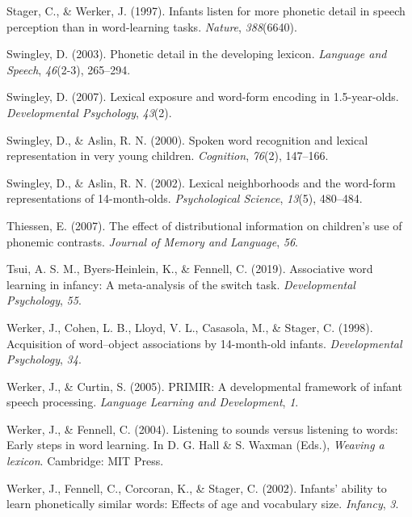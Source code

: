 \documentclass[english,,man]{apa6}
\begin{document}
\leavevmode\hypertarget{ref-stager1997}{}%
Stager, C., \& Werker, J. (1997). Infants listen for more phonetic detail in speech perception than in word-learning tasks. \emph{Nature}, \emph{388}(6640).

\leavevmode\hypertarget{ref-swingley2003}{}%
Swingley, D. (2003). Phonetic detail in the developing lexicon. \emph{Language and Speech}, \emph{46}(2-3), 265--294.

\leavevmode\hypertarget{ref-swingley2007}{}%
Swingley, D. (2007). Lexical exposure and word-form encoding in 1.5-year-olds. \emph{Developmental Psychology}, \emph{43}(2).

\leavevmode\hypertarget{ref-swingley2000}{}%
Swingley, D., \& Aslin, R. N. (2000). Spoken word recognition and lexical representation in very young children. \emph{Cognition}, \emph{76}(2), 147--166.

\leavevmode\hypertarget{ref-swingley2002}{}%
Swingley, D., \& Aslin, R. N. (2002). Lexical neighborhoods and the word-form representations of 14-month-olds. \emph{Psychological Science}, \emph{13}(5), 480--484.

\leavevmode\hypertarget{ref-thiessen2007}{}%
Thiessen, E. (2007). The effect of distributional information on children's use of phonemic contrasts. \emph{Journal of Memory and Language}, \emph{56}.

\leavevmode\hypertarget{ref-tsui2019}{}%
Tsui, A. S. M., Byers-Heinlein, K., \& Fennell, C. (2019). Associative word learning in infancy: A meta-analysis of the switch task. \emph{Developmental Psychology}, \emph{55}.

\leavevmode\hypertarget{ref-werker1998}{}%
Werker, J., Cohen, L. B., Lloyd, V. L., Casasola, M., \& Stager, C. (1998). Acquisition of word--object associations by 14-month-old infants. \emph{Developmental Psychology}, \emph{34}.

\leavevmode\hypertarget{ref-werker2005}{}%
Werker, J., \& Curtin, S. (2005). PRIMIR: A developmental framework of infant speech processing. \emph{Language Learning and Development}, \emph{1}.

\leavevmode\hypertarget{ref-werker2004}{}%
Werker, J., \& Fennell, C. (2004). Listening to sounds versus listening to words: Early steps in word learning. In D. G. Hall \& S. Waxman (Eds.), \emph{Weaving a lexicon}. Cambridge: MIT Press.

\leavevmode\hypertarget{ref-werker2002}{}%
Werker, J., Fennell, C., Corcoran, K., \& Stager, C. (2002). Infants' ability to learn phonetically similar words: Effects of age and vocabulary size. \emph{Infancy}, \emph{3}.
\end{document}
